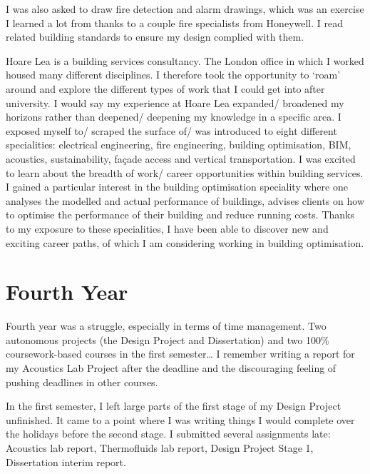 I was also asked to draw fire detection and alarm drawings, which was an exercise I learned a lot from thanks to a couple fire specialists from Honeywell.
I read related building standards to ensure my design complied with them.

Hoare Lea is a building services consultancy.
The London office in which I worked housed many different disciplines.
I therefore took the opportunity to `roam' around and explore the different types of work that I could get into after university.
I would say my experience at Hoare Lea expanded/ broadened my horizons rather than deepened/ deepening my knowledge in a specific area.
I exposed myself to/ scraped the surface of/ was introduced to eight different specialities:
electrical engineering,
fire engineering,
building optimisation,
BIM,
acoustics,
sustainability,
façade access and
vertical transportation.
I was excited to learn about the breadth of work/ career opportunities within building services.
I gained a particular interest in the building optimisation speciality where one analyses the modelled and actual performance of buildings, advises clients on how to optimise the performance of their building and reduce running costs.
Thanks to my exposure to these specialities, I have been able to discover new and exciting career paths, of which I am considering working in building optimisation.



\section{Fourth Year}

Fourth year was a struggle, especially in terms of time management.
Two autonomous projects (the Design Project and Dissertation) and two 100\% coursework-based courses in the first semester…
I remember writing a report for my Acoustics Lab Project after the deadline and the discouraging feeling of pushing deadlines in other courses.

In the first semester, I left large parts of the first stage of my Design Project unfinished.
It came to a point where I was writing things I would complete over the holidays before the second stage.
I submitted several assignments late: Acoustics lab report, Thermofluids lab report, Design Project Stage 1, Dissertation interim report.

